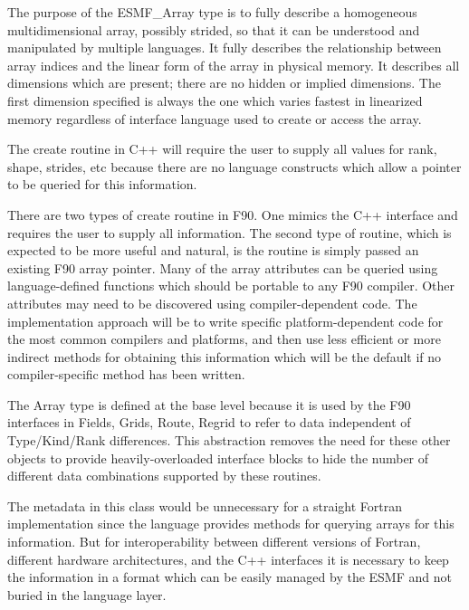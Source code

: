 


The purpose of the ESMF\_Array type is to fully describe a homogeneous
multidimensional array, possibly strided, so that it can be understood
and manipulated by multiple languages.   It fully describes the
relationship between array indices and the linear form of the array
in physical memory.  It describes all dimensions which are present;
there are no hidden or implied dimensions.  The first dimension specified
is always the one which varies fastest in linearized memory regardless of
interface language used to create or access the array.

The create routine in C++ will require the user to supply all values for
rank, shape, strides, etc because there are no language constructs which
allow a pointer to be queried for this information.

There are two types of create routine in F90.  One mimics the C++
interface and requires the user to supply all information.  
The second
type of routine, which is expected to be more useful and natural, is
the routine is simply passed an existing F90 array pointer.   Many of the
array attributes can be queried using language-defined functions which
should be portable to any F90 compiler.   Other attributes may need to
be discovered using compiler-dependent code.  The implementation approach
will be to write specific platform-dependent code for the most common
compilers and platforms, and then use less efficient or more indirect 
methods for obtaining this information which will be the default if 
no compiler-specific method has been written.

The Array type is defined at the base level because it is used by the
F90 interfaces in Fields, Grids, Route, Regrid to refer to data 
independent of Type/Kind/Rank differences.  This abstraction removes
the need for these other objects to provide
heavily-overloaded interface blocks to hide the number of
different data combinations supported by these routines.

The metadata in this class would be unnecessary for a straight
Fortran implementation since the language provides methods for querying
arrays for this information.  But for interoperability between different
versions of Fortran, different hardware architectures, 
and the C++ interfaces
it is necessary to keep the information in a format which can be
easily managed by the ESMF and not buried in the language layer.

